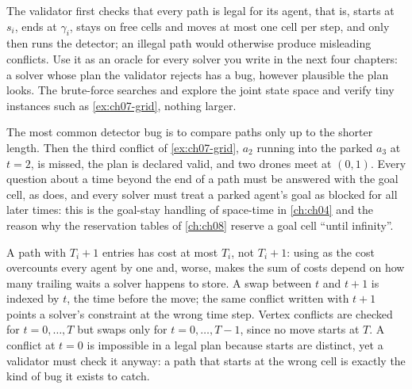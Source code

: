 The validator  first checks that
every path is legal for its agent, that is, starts at $s_i$, ends at $\gamma_i$,
stays on free cells and moves at most one cell per step, and only then runs
the detector; an illegal path would otherwise produce misleading conflicts.
Use it as an oracle for every solver you write in the next four chapters: a
solver whose plan the validator rejects has a bug, however plausible the plan
looks. The brute-force searches  and
 explore the joint state space and verify
tiny instances such as \cref{ex:ch07-grid}, nothing larger.

\begin{pitfall}
The most common detector bug is to compare paths only up to the shorter
length. Then the third conflict of \cref{ex:ch07-grid}, $a_2$ running into
the parked $a_3$ at $t = 2$, is missed, the plan is declared valid, and two
drones meet at $(0,1)$. Every question about a time beyond the end of a path
must be answered with the goal cell, as \MapfPosition does, and every solver
must treat a parked agent's goal as blocked for all later times: this is the
goal-stay handling of space-time \astar in \cref{ch:ch04} and the reason why
the reservation tables of \cref{ch:ch08} reserve a goal cell ``until
infinity''.
\end{pitfall}

\begin{pitfall}
A path with $T_i + 1$ entries has cost at most $T_i$, not $T_i + 1$: using
 as the cost overcounts every agent by one and, worse, makes
the sum of costs depend on how many trailing waits a solver happens to store.
A swap between $t$ and $t+1$ is indexed by $t$, the time before the move;
the same conflict written with $t+1$ points a solver's constraint at the
wrong time step. Vertex conflicts are checked for $t = 0, \dots, T$ but
swaps only for $t = 0, \dots, T-1$, since no move starts at $T$. A conflict at
$t = 0$ is impossible in a legal plan because starts are distinct, yet a
validator must check it anyway: a path that starts at the wrong cell is
exactly the kind of bug it exists to catch.
\end{pitfall}

